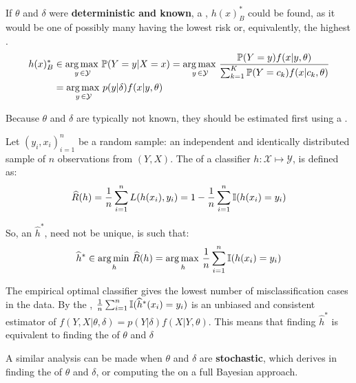 If $\theta$ and $\delta$ were \textbf{deterministic and known}, a , $h(x)^*_B$ could be found, as it would be one of possibly many having the lowest risk or, equivalently, the highest .
\begin{align*}
    h(x)^*_B &\in   \operatorname*{arg\,max\,}_{y\,\in\mathcal{Y}}\operatorname{\mathbb{P}}(Y=y|X={x}) = \operatorname*{arg\,max\,}_{y\,\in\mathcal{Y}} \frac{\operatorname{\mathbb{P}}(Y=y)f(x|y,\theta)}{\sum_{k=1}^K \operatorname{\mathbb{P}}(Y=c_k)f(x|c_k,\theta)} \\ &= \operatorname*{arg\,max\,}_{y\,\in\mathcal{Y}} p(y|\delta)f(x|y,\theta)
\end{align*}

Because $\theta$ and $\delta$ are typically not known, they should be estimated first using a .

Let $(y_i,x_i)_{i=1}^n$ be a random sample: an independent and identically distributed sample of $n$ observations from $(Y,X)$. The  of a classifier $h:\mathcal{X}\mapsto\mathcal{Y}$, is defined as:
\begin{equation*}
   \widehat{R}(h) = \frac{1}{n} \sum_{i=1}^n L(h({x}_i),y_i) = 1-\frac{1}{n}\sum_{i=1}^{n}\operatorname{\mathbb{I}}(h({x}_i)=y_i)
\end{equation*}

So, an  $\widehat{h}^*$, need not be unique, is such that:
\begin{equation*}
    \widehat{h}^* \in 
    \operatorname*{arg\,min\,}_{h} \widehat{R}(h) = \operatorname*{arg\,max\,}_{h}\frac{1}{n}\sum_{i=1}^{n}\operatorname{\mathbb{I}}(h(x_i)=y_i)
\end{equation*}

The empirical optimal classifier gives the lowest number of misclassification cases in the data. By the , $\frac{1}{n}\sum_{i=1}^{n}\operatorname{\mathbb{I}}(\widehat{h}^*({x}_i)=y_i)$ is an unbiased and consistent estimator of $f(Y,X|\theta,\delta)=p(Y|\delta)f(X|Y,\theta)$. This means that finding $\widehat{h}^*$ is equivalent to finding the  of $\theta$ and $\delta$

A similar analysis can be made when $\theta$ and $\delta$ are \textbf{stochastic}, which derives in finding the  of $\theta$ and $\delta$, or computing the  on a full Bayesian approach.


